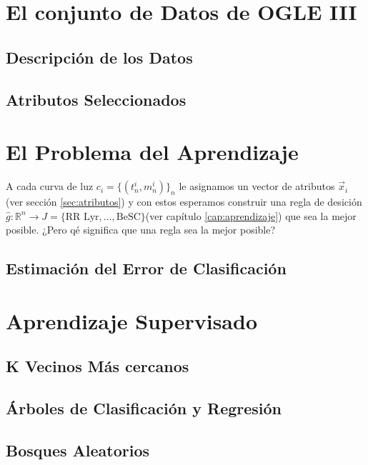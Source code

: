\documentclass[letterpaper,12pt]{book}
\begin{document}
\chapter{El conjunto de Datos de OGLE III\label{cap:losDatos}}
\section{Descripción de los Datos}
\section{Atributos Seleccionados \label{sec:atributos}}

\chapter{El Problema del Aprendizaje\label{cap:problemaAprendizaje}}

A cada curva de luz $c_{i} = \{(t_{n}^{i},m_{n}^{i} )\}_{n}$ le asignamos un vector de atributos $\vec{x}_{i}$ (ver sección \ref{sec:atributos}) y con estos esperamos construir una regla de desición $\hat{g}:\mathbb{R}^n\rightarrow J= \{\text{RR Lyr}, \dots, \text{BeSC}\}$(ver capítulo \ref{cap:aprendizaje}) que sea la mejor posible. ¿Pero qé significa que una regla sea la mejor posible? 

\section{Estimación del Error de Clasificación}\label{sec:estimacionError}

\chapter{Aprendizaje Supervisado\label{cap:aprendizaje}}

\section{K Vecinos Más cercanos}

\section{Árboles de Clasificación y Regresión}

\section{Bosques Aleatorios}%




\end{document}
